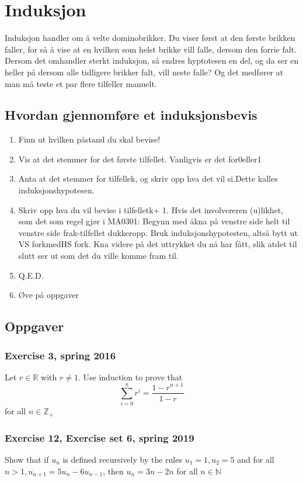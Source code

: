 \section{Induksjon}

Induksjon handler om å velte dominobrikker. Du viser først at den første brikken faller, for så å vise at en hvilken som helst brikke vill falle, dersom den forrie falt.
Dersom det omhandler sterkt induksjon, så endres hyptotesen en del, og da ser en heller på dersom alle tidligere brikker falt, vill neste falle? Og det medfører at man må teste et par flere tilfeller manuelt.

\subsection{Hvordan gjennomføre et induksjonsbevis}
\begin{enumerate}
    \item Finn ut hvilken påstand du skal bevise!
    \item Vis at det stemmer for det første tilfellet. Vanligvis er det for0eller1
    \item Anta at det stemmer for tilfellek, og skriv opp hva det vil si.Dette kalles induksjonshypotesen.
    \item Skriv opp hva du vil bevise i tilfelletk+ 1. Hvis det involvereren (u)likhet, som det som regel gjør i MA0301: Begynn med åkna på venstre side helt til venstre side frak-tilfellet dukkeropp. Bruk induksjonshypotesten, altså bytt ut VS forkmedHS fork. Kna videre på det uttrykket du nå har fått, slik atdet til slutt ser ut som det du ville komme fram til.
    \item Q.E.D.
    \item Øve på oppgaver
\end{enumerate}

\subsection{Oppgaver}

\subsubsection{Exercise 3, spring 2016}
Let $r\in\mathbb{R}$ with $r\neq 1$. Use induction to prove that
\[
\sum_{i=0}^{n}r^i = \frac{1-r^{n+1}}{1-r}    
\]
for all $n\in \mathbb{Z}_+$

\subsubsection{Exercise 12, Exercise set 6, spring 2019}
Show that if $u_n$ is defined recursively by the 
rules $u_1 = 1,u_2 = 5$ and for all $n>1,u_{n+1}= 5u_n -6u_{n-1}$, then $u_n = 3n-2n$ for all $n\in \mathbb{N}$

